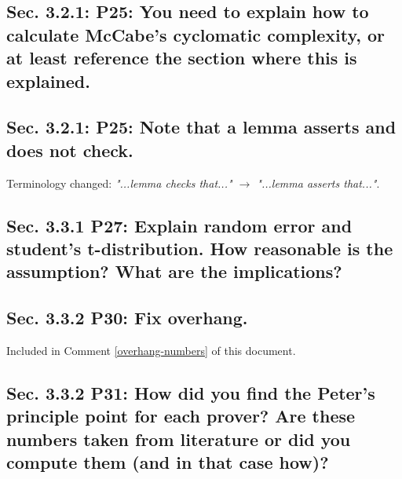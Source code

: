 \documentclass[]{article}
\begin{document}
\subsection{Sec. 3.2.1: P25: You need to explain how to calculate McCabe's cyclomatic complexity, or at least reference the section where this is explained.}

\subsection{Sec. 3.2.1: P25: Note that a lemma asserts and does not check.}

Terminology changed: \emph{"...lemma checks that..." $\rightarrow$ "...lemma asserts that..."}.

\subsection{Sec. 3.3.1 P27: Explain random error and student's t-distribution. How reasonable is the assumption? What are the implications?}

\subsection{Sec. 3.3.2 P30: Fix overhang.}

Included in Comment \ref{overhang-numbers} of this document.

\subsection{Sec. 3.3.2 P31: How did you find the Peter's principle point for each prover? Are these numbers taken from literature or did you compute them (and in that case how)?}
\end{document}
